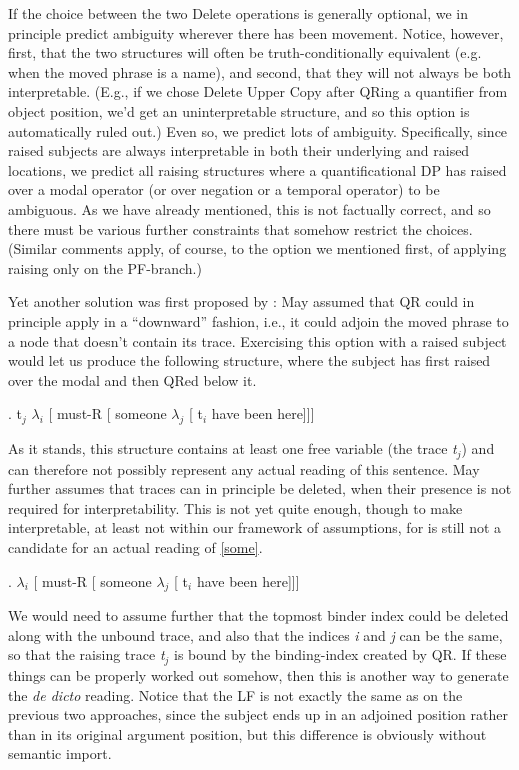If the choice between the two Delete operations is generally optional, we in principle predict ambiguity wherever there has been movement. Notice, however, first, that the two structures will often be truth-conditionally equivalent (e.g. when the moved phrase is a name), and second, that they will not always be both interpretable. (E.g., if we chose Delete Upper Copy after QRing a quantifier from object position, we'd get an uninterpretable structure, and so this option is automatically ruled out.) Even so, we predict lots of ambiguity. Specifically, since raised subjects are always interpretable in both their underlying and raised locations, we predict all raising structures where a quantificational DP has raised over a modal operator (or over negation or a temporal operator) to be ambiguous. As we have already mentioned, this is not factually correct, and so there must be various further constraints that somehow restrict the choices. (Similar comments apply, of course, to the option we mentioned first, of applying raising only on the PF-branch.)

Yet another solution was first proposed by \citet{may:1977:thesis}: May assumed that QR could in principle apply in a ``downward'' fashion, i.e., it could adjoin the moved phrase to a node that doesn't contain its trace. Exercising this option with a raised subject would let us produce the following structure, where the subject has first raised over the modal and then QRed below it.

\ex. t$_j$ $\lambda_i$ [ must-R [ someone $\lambda_j$ [ t$_i$ have been here]]]

As it stands, this structure contains at least one free variable (the trace \emph{t}$_j$) and can therefore not possibly represent any actual reading of this sentence. May further assumes that traces can in principle be deleted, when their presence is not required for interpretability. This is not yet quite enough, though to make \Last interpretable, at least not within our framework of assumptions, for \Next is still not a candidate for an actual reading of \ref{some}.

\ex. $\lambda_i$ [ must-R [ someone $\lambda_j$ [ t$_i$ have been here]]]

We would need to assume further that the topmost binder index could be deleted along with the unbound trace, and also that the indices \emph{i} and \emph{j} can be the same, so that the raising trace \emph{t}$_j$ is bound by the binding-index created by QR. If these things can be properly worked out somehow, then this is another way to generate the \emph{de dicto} reading. Notice that the LF is not exactly the same as on the previous two approaches, since the subject ends up in an adjoined position rather than in its original argument position, but this difference is obviously without semantic import.

